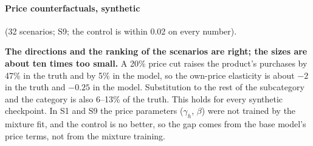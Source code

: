 \documentclass[11pt]{article}
\begin{document}
\paragraph{Price counterfactuals, synthetic} (32 scenarios; S9; the control is within 0.02 on
every number).
\begin{center}\small
{}
\end{center}
\textbf{The directions and the ranking of the scenarios are right; the sizes are about ten times
too small.} A 20\% price cut raises the product's purchases by 47\% in the truth and by 5\% in the
model, so the own-price elasticity is about $-2$ in the truth and $-0.25$ in the model. Substitution
to the rest of the subcategory and the category is also 6--13\% of the truth. This holds for every
synthetic checkpoint. In S1 and S9 the price parameters ($\gamma_h$, $\beta$) were not trained by
the mixture fit, and the control is no better, so the gap comes from the base model's price terms,
not from the mixture training.
\end{document}
